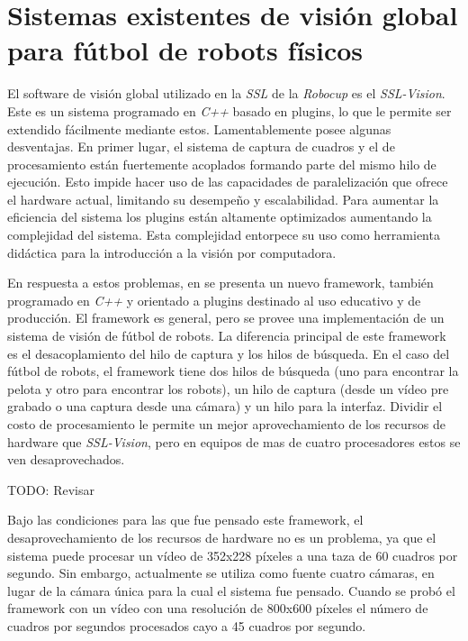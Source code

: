 
\section{Sistemas existentes de visión global para fútbol de robots físicos}


El software de visión global utilizado en la \emph{SSL} de la \emph{Robocup} es
el \emph{SSL-Vision}\cite{sslvision}. Este es un sistema programado en
\emph{C++} basado en plugins, lo que le permite ser extendido fácilmente
mediante estos. Lamentablemente posee algunas desventajas. En primer lugar, el
sistema de captura de cuadros y el de procesamiento están fuertemente acoplados
formando parte del mismo hilo de ejecución. Esto impide hacer uso de las
capacidades de paralelización que ofrece el hardware actual, limitando su
desempeño y escalabilidad. Para aumentar la eficiencia del sistema los plugins
están altamente optimizados aumentando la complejidad del sistema. Esta
complejidad entorpece su uso como herramienta didáctica para la introducción a
la visión por computadora.

En respuesta a estos problemas, en \cite{torres2012,torres2014} se presenta un
nuevo framework, también programado en \emph{C++} y orientado a plugins
destinado al uso educativo y de producción. El framework es general, pero se
provee una implementación de un sistema de visión de fútbol de robots. La
diferencia principal de este framework es el desacoplamiento del hilo de captura
y los hilos de búsqueda. En el caso del fútbol de robots, el framework tiene dos
hilos de búsqueda (uno para encontrar la pelota y otro para encontrar los
robots), un hilo de captura (desde un vídeo pre grabado o una captura desde una
cámara) y un hilo para la interfaz. Dividir el costo de procesamiento le permite
un mejor aprovechamiento de los recursos de hardware que \emph{SSL-Vision}, pero
en equipos de mas de cuatro procesadores estos se ven desaprovechados.

TODO: Revisar

Bajo las condiciones para las que fue pensado este framework, el
desaprovechamiento de los recursos de hardware no es un problema, ya que el
sistema puede procesar un vídeo de 352x228 píxeles a una taza de 60 cuadros por
segundo. Sin embargo, actualmente se utiliza como fuente cuatro cámaras, en
lugar de la cámara única para la cual el sistema fue pensado. Cuando se probó el
framework con un vídeo con una resolución de 800x600 píxeles el número de
cuadros por segundos procesados cayo a 45 cuadros por segundo.
